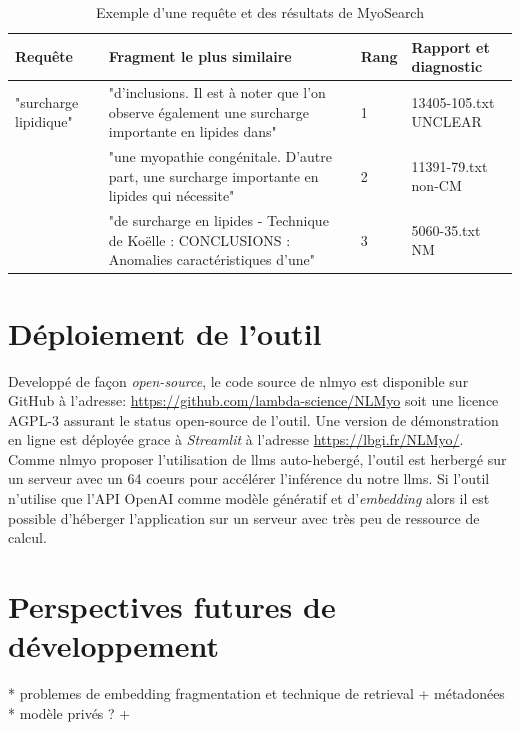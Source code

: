 \begin{table}[ht]
\centering
\caption{Exemple d'une requête et des résultats de MyoSearch}
\label{tab:myosearch_results}
\begin{tabularx}{\textwidth}{|X|X|p{1cm}|p{2cm}|}
\toprule
\textbf{Requête} & \textbf{Fragment le plus similaire} & \textbf{Rang} & \textbf{Rapport et diagnostic} \\\hline
"surcharge lipidique" & "d’inclusions. Il est à noter que l’on observe également une surcharge importante en lipides dans" \newline & 1 & 13405-105.txt UNCLEAR \\
 & "une myopathie congénitale. D'autre part, une surcharge importante en lipides qui nécessite"\newline & 2 & 11391-79.txt non-CM \\
 & "de surcharge en lipides - Technique de Koëlle : CONCLUSIONS : Anomalies caractéristiques d’une" & 3 & 5060-35.txt NM \\ \hline
\end{tabularx}
\end{table}
\section{Déploiement de l'outil}
Developpé de façon \textit{open-source}, le code source de \gls{nlmyo} est disponible sur GitHub à l'adresse: \href{https://github.com/lambda-science/NLMyo}{https://github.com/lambda-science/NLMyo} soit une licence AGPL-3 assurant le status open-source de l'outil. Une version de démonstration en ligne est déployée grace à \textit{Streamlit} à l'adresse \href{https://lbgi.fr/NLMyo/}{https://lbgi.fr/NLMyo/}. Comme \gls{nlmyo} proposer l'utilisation de \gls{llms} auto-hebergé, l'outil est herbergé sur un serveur avec un 64 coeurs pour accélérer l'inférence du notre \gls{llms}. Si l'outil n'utilise que l'API OpenAI comme modèle génératif et d'\textit{embedding} alors il est possible d'héberger l'application sur un serveur avec très peu de ressource de calcul.
\section{Perspectives futures de développement}
* problemes de embedding fragmentation et technique de retrieval + métadonées
* modèle privés ? + 